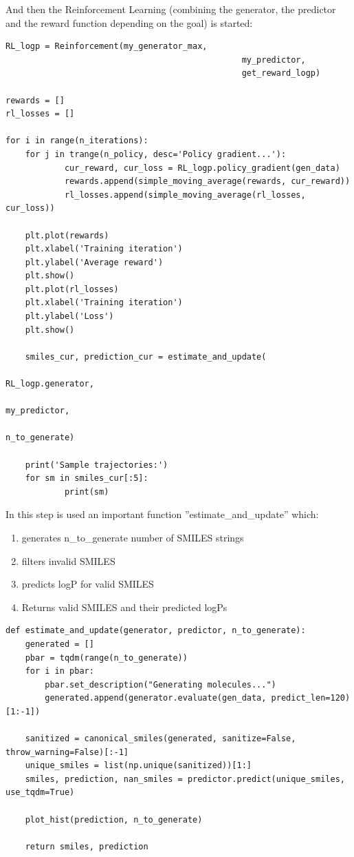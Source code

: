 \documentclass[a4paper]{article}
\begin{document}
And then the Reinforcement Learning (combining the generator, the predictor and the reward function depending on the goal) is started:

\begin{lstlisting}
RL_logp = Reinforcement(my_generator_max, 
												my_predictor, 
												get_reward_logp)

rewards = []
rl_losses = []

for i in range(n_iterations):
	for j in trange(n_policy, desc='Policy gradient...'):
			cur_reward, cur_loss = RL_logp.policy_gradient(gen_data)
			rewards.append(simple_moving_average(rewards, cur_reward)) 
			rl_losses.append(simple_moving_average(rl_losses, cur_loss))
	
	plt.plot(rewards)
	plt.xlabel('Training iteration')
	plt.ylabel('Average reward')
	plt.show()
	plt.plot(rl_losses)
	plt.xlabel('Training iteration')
	plt.ylabel('Loss')
	plt.show()
			
	smiles_cur, prediction_cur = estimate_and_update(
																				RL_logp.generator, 
																				my_predictor, 
																				n_to_generate)
																									
	print('Sample trajectories:')
	for sm in smiles_cur[:5]:
			print(sm)
\end{lstlisting}

In this step is used an important function ''estimate\_and\_update'' which:
\begin{enumerate}
	\item generates n\_to\_generate number of SMILES strings
	\item filters invalid SMILES
	\item predicts logP for valid SMILES
	\item Returns valid SMILES and their predicted logPs
\end{enumerate}

\begin{lstlisting}
def estimate_and_update(generator, predictor, n_to_generate):
    generated = []
    pbar = tqdm(range(n_to_generate))
    for i in pbar:
        pbar.set_description("Generating molecules...")
        generated.append(generator.evaluate(gen_data, predict_len=120)[1:-1])

    sanitized = canonical_smiles(generated, sanitize=False, throw_warning=False)[:-1]
    unique_smiles = list(np.unique(sanitized))[1:]
    smiles, prediction, nan_smiles = predictor.predict(unique_smiles, use_tqdm=True)  
                                                       
    plot_hist(prediction, n_to_generate)
        
    return smiles, prediction
\end{lstlisting}
\end{document}
